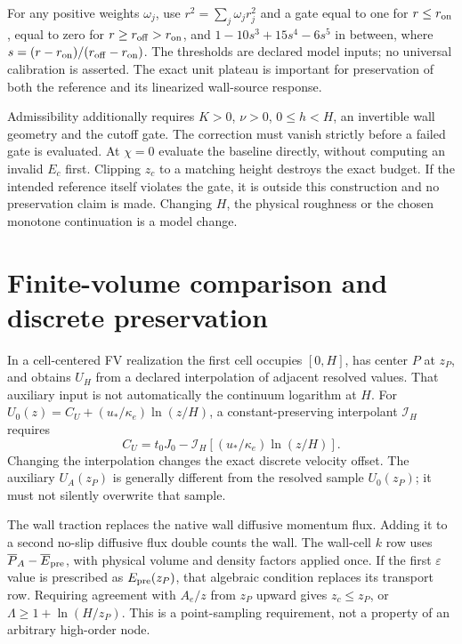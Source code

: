 \documentclass[11pt,a4paper]{article}
\numberwithin{equation}{section}
\newcommand{\eps}{\varepsilon}
\begin{document}
For any positive weights $\omega_j$, use
$r^2=\sum_j\omega_jr_j^2$ and a gate equal to one for
$r\leq r_{\rm on}$, equal to zero for $r\geq r_{\rm off}>r_{\rm on}$,
and $1-10s^3+15s^4-6s^5$ in between, where
$s=(r-r_{\rm on})/(r_{\rm off}-r_{\rm on})$.
The thresholds are declared model inputs; no universal calibration is
asserted. The exact unit plateau is important for preservation of both
the reference and its linearized wall-source response.

Admissibility additionally requires $K>0$, $\nu>0$, $0\leq h<H$,
an invertible wall geometry and the cutoff gate. The correction must
vanish strictly before a failed gate is evaluated. At $\chi=0$ evaluate
the baseline directly, without computing an invalid $E_c$ first.
Clipping $z_c$ to a matching height destroys the exact budget.
If the intended reference itself violates the gate, it is outside this
construction and no preservation claim is made. Changing $H$, the
physical roughness or the chosen monotone continuation is a model change.

\section{Finite-volume comparison and discrete preservation}
\label{sec:fv}
In a cell-centered FV realization the first cell occupies $[0,H]$,
has center $P$ at $z_P$, and obtains $U_H$ from a declared interpolation
of adjacent resolved values. That auxiliary input is not automatically
the continuum logarithm at $H$. For
$U_0(z)=C_U+(u_*/\kappa_e)\ln(z/H)$, a constant-preserving
interpolant $\mathcal I_H$ requires
\begin{equation}
 C_U=t_0J_0-\mathcal I_H[(u_*/\kappa_e)\ln(z/H)].
 \label{eq:fv-anchor}
\end{equation}
Changing the interpolation changes the exact discrete velocity offset.
The auxiliary $U_A(z_P)$ is generally different from the resolved
sample $U_0(z_P)$; it must not silently overwrite that sample.

The wall traction replaces the native wall diffusive momentum flux.
Adding it to a second no-slip diffusive flux double counts the wall.
The wall-cell $k$ row uses
$\overline P_A-\overline E_{\rm pre}$, with physical volume and density
factors applied once. If the first $\eps$ value is prescribed as
$E_{\rm pre}(z_P)$, that algebraic condition replaces its transport row.
Requiring agreement with $A_e/z$ from $z_P$ upward gives
$z_c\leq z_P$, or $\Lambda\geq1+\ln(H/z_P)$.
This is a point-sampling requirement, not a property of an arbitrary
high-order node.
\end{document}
